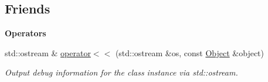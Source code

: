 \subsection*{Friends}
\begin{Indent}\textbf{ Operators}\par
\begin{DoxyCompactItemize}
\item 
std\+::ostream \& \mbox{\hyperlink{classrev_1_1_object_a9f6a5f5e48e10f088c819edd560f530f}{operator$<$$<$}} (std\+::ostream \&os, const \mbox{\hyperlink{classrev_1_1_object}{Object}} \&object)
\begin{DoxyCompactList}\small\item\em Output debug information for the class instance via std\+::ostream. \end{DoxyCompactList}\end{DoxyCompactItemize}
\end{Indent}
